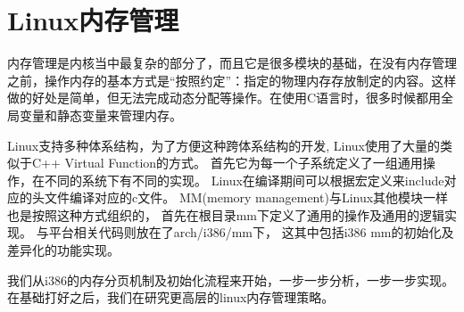 
\chapter{Linux内存管理}

内存管理是内核当中最复杂的部分了，而且它是很多模块的基础，在没有内存管理之前，操作内存的基本方式是“按照约定”：指定的物理内存存放制定的内容。这样做的好处是简单，但无法完成动态分配等操作。在使用C语言时，很多时候都用全局变量和静态变量来管理内存。

Linux支持多种体系结构，为了方便这种跨体系结构的开发, Linux使用了大量的类似于C++ Virtual Function的方式。
首先它为每一个子系统定义了一组通用操作，在不同的系统下有不同的实现。
Linux在编译期间可以根据宏定义来include对应的头文件编译对应的c文件。
MM(memory management)与Linux其他模块一样也是按照这种方式组织的， 首先在根目录mm下定义了通用的操作及通用的逻辑实现。
与平台相关代码则放在了arch/i386/mm下， 这其中包括i386 mm的初始化及差异化的功能实现。

我们从i386的内存分页机制及初始化流程来开始，一步一步分析，一步一步实现。
在基础打好之后，我们在研究更高层的linux内存管理策略。

